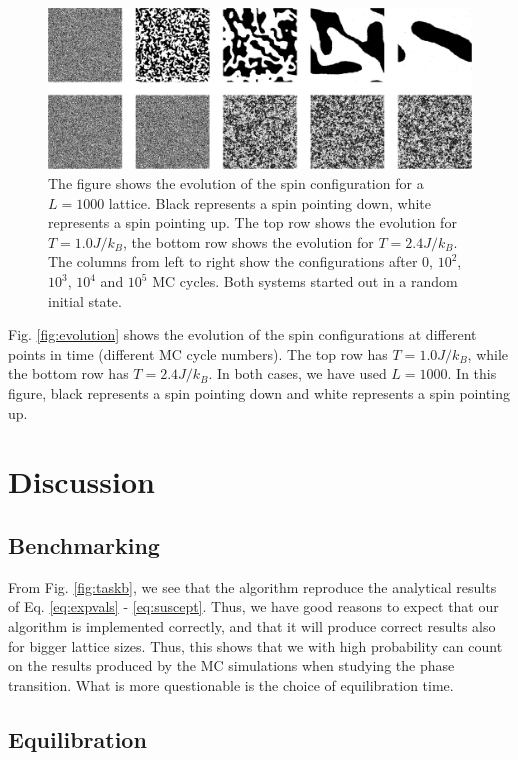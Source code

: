 \documentclass[%
 reprint,
nofootinbib,
aps,
]{revtex4-1}
\begin{document}
\begin{figure}
\includegraphics[width=\textwidth]{../figures/evolution.pdf}
\caption{The figure shows the evolution of the spin configuration for a $L = 1000$ lattice. Black represents a spin pointing down, white represents a spin pointing up. The top row shows the evolution for $T = 1.0J/k_B$, the bottom row shows the evolution  for $T = 2.4J/k_B$. The columns from left to right show the configurations after $0$, $10^2$, $10^3$, $10^4$ and $10^5$ MC cycles. Both systems started out in a random initial state.}
\label{fig:evolution}
\end{figure}

Fig. \vref{fig:evolution} shows the evolution of the spin configurations at different points in time (different MC cycle numbers). The top row has $T = 1.0J/k_B$, while the bottom row has $T = 2.4J/k_B$. In both cases, we have used $L = 1000$. In this figure, black represents a spin pointing down and white represents a spin pointing up.


\section{Discussion}

\subsection{Benchmarking}
From Fig. \vref{fig:taskb}, we see that the algorithm reproduce the analytical results of Eq. \eqref{eq:expvals} - \eqref{eq:suscept}. Thus, we have good reasons to expect that our algorithm is implemented correctly, and that it will produce correct results also for bigger lattice sizes. Thus, this shows that we with high probability can count on the results produced by the MC simulations when studying the phase transition. What is more questionable is the choice of equilibration time.


\subsection{Equilibration}
\end{document}
